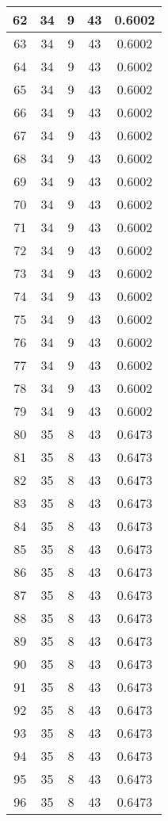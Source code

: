 \documentclass[letterpaper, 12pt]{article}
\begin{document}
\begin{longtable}{|c|c|c|c|c|}
\hline
62 & 34 & 9 & 43 & 0.6002 \\
\hline
63 & 34 & 9 & 43 & 0.6002 \\
\hline
64 & 34 & 9 & 43 & 0.6002 \\
\hline
65 & 34 & 9 & 43 & 0.6002 \\
\hline
66 & 34 & 9 & 43 & 0.6002 \\
\hline
67 & 34 & 9 & 43 & 0.6002 \\
\hline
68 & 34 & 9 & 43 & 0.6002 \\
\hline
69 & 34 & 9 & 43 & 0.6002 \\
\hline
70 & 34 & 9 & 43 & 0.6002 \\
\hline
71 & 34 & 9 & 43 & 0.6002 \\
\hline
72 & 34 & 9 & 43 & 0.6002 \\
\hline
73 & 34 & 9 & 43 & 0.6002 \\
\hline
74 & 34 & 9 & 43 & 0.6002 \\
\hline
75 & 34 & 9 & 43 & 0.6002 \\
\hline
76 & 34 & 9 & 43 & 0.6002 \\
\hline
77 & 34 & 9 & 43 & 0.6002 \\
\hline
78 & 34 & 9 & 43 & 0.6002 \\
\hline
79 & 34 & 9 & 43 & 0.6002 \\
\hline
80 & 35 & 8 & 43 & 0.6473 \\
\hline
81 & 35 & 8 & 43 & 0.6473 \\
\hline
82 & 35 & 8 & 43 & 0.6473 \\
\hline
83 & 35 & 8 & 43 & 0.6473 \\
\hline
84 & 35 & 8 & 43 & 0.6473 \\
\hline
85 & 35 & 8 & 43 & 0.6473 \\
\hline
86 & 35 & 8 & 43 & 0.6473 \\
\hline
87 & 35 & 8 & 43 & 0.6473 \\
\hline
88 & 35 & 8 & 43 & 0.6473 \\
\hline
89 & 35 & 8 & 43 & 0.6473 \\
\hline
90 & 35 & 8 & 43 & 0.6473 \\
\hline
91 & 35 & 8 & 43 & 0.6473 \\
\hline
92 & 35 & 8 & 43 & 0.6473 \\
\hline
93 & 35 & 8 & 43 & 0.6473 \\
\hline
94 & 35 & 8 & 43 & 0.6473 \\
\hline
95 & 35 & 8 & 43 & 0.6473 \\
\hline
96 & 35 & 8 & 43 & 0.6473 \\

\end{longtable}
\end{document}
